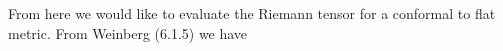 \documentclass[10pt,letterpaper]{article}
\begin{document}
\ea
From here we would like to evaluate the Riemann tensor for a conformal to flat metric. From Weinberg (6.1.5) we have
\end{document}
